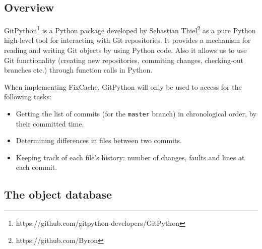 \documentclass[12pt,twoside,notitlepage]{report}
\newcommand{\fxch}{FixCache}
\begin{document}
\subsection{Overview}
GitPython\footnote{https://github.com/gitpython-developers/GitPython} is a Python package developed by Sebastian Thiel\footnote{https://github.com/Byron} as a pure Python high-level tool for interacting with Git repositories. It provides a mechanism for reading and writing Git objects by using Python code. Also it allows us to use Git functionality (creating new repositories, commiting changes, checking-out branches etc.) through function calls in Python.

When implementing \fxch{}, GitPython will only be used to access for the following tasks:
\begin{itemize}
\item Getting the list of commits (for the \texttt{master} branch) in chronological order, by their committed time.
\item Determining differences in files between two commits.
\item Keeping track of each file's history: number of changes, faults and lines at each commit.
\end{itemize}
\subsection{The object database}\label{dbbackend}
\end{document}
